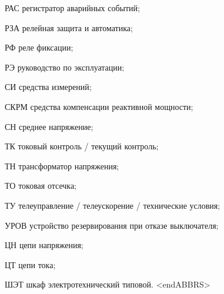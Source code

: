\begin{list}{}
\item[РАС] регистратор аварийных событий;
\item[РЗА] релейная защита и автоматика;
\item[РФ] реле фиксации;
\item[РЭ] руководство по эксплуатации;
\item[СИ] средства измерений;
\item[СКРМ] средства компенсации реактивной мощности;
\item[СН] среднее напряжение;
\item[ТК] токовый контроль / текущий контроль;
\item[ТН] трансформатор напряжения;
\item[ТО] токовая отсечка;
\item[ТУ] телеуправление / телеускорение / технические условия;
\item[УРОВ] устройство резервирования при отказе выключателя;
\item[ЦН] цепи напряжения;
\item[ЦТ] цепи тока;
\item[ШЭТ] шкаф электротехнический типовой.
{\color{white}\fontsize{0.1pt}{0.1pt}\selectfont<endABBRS>}
\end{list}
